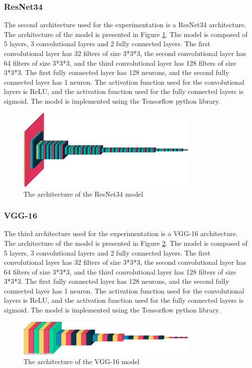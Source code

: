 \documentclass[12pt, letterpaper]{article}
\begin{document}
\subsubsection{ResNet34}
The second architecture used for the experimentation is a ResNet34 architecture. The architecture of the model is presented in Figure \ref{fig:ResNet34}. The model is composed of 5 layers, 3 convolutional layers and 2 fully connected layers. The first convolutional layer has 32 filters of size 3*3*3, the second convolutional layer has 64 filters of size 3*3*3, and the third convolutional layer has 128 filters of size 3*3*3. The first fully connected layer has 128 neurons, and the second fully connected layer has 1 neuron. The activation function used for the convolutional layers is ReLU, and the activation function used for the fully connected layers is sigmoid. The model is implemented using the Tensorflow python library.
\begin{figure}[h]
    \centering
    \includegraphics[width=0.8\textwidth]{resnet.png}
    \caption{The architecture of the ResNet34 model}
    \label{fig:ResNet34}
\end{figure}
\subsubsection{VGG-16}
The third architecture used for the experimentation is a VGG-16 architecture. The architecture of the model is presented in Figure \ref{fig:VGG16}. The model is composed of 5 layers, 3 convolutional layers and 2 fully connected layers. The first convolutional layer has 32 filters of size 3*3*3, the second convolutional layer has 64 filters of size 3*3*3, and the third convolutional layer has 128 filters of size 3*3*3. The first fully connected layer has 128 neurons, and the second fully connected layer has 1 neuron. The activation function used for the convolutional layers is ReLU, and the activation function used for the fully connected layers is sigmoid. The model is implemented using the Tensorflow python library.
\begin{figure}[h]
    \centering
    \includegraphics[width=0.8\textwidth]{vgg.png}
    \caption{The architecture of the VGG-16 model}
    \label{fig:VGG16}
\end{figure}
\end{document}
